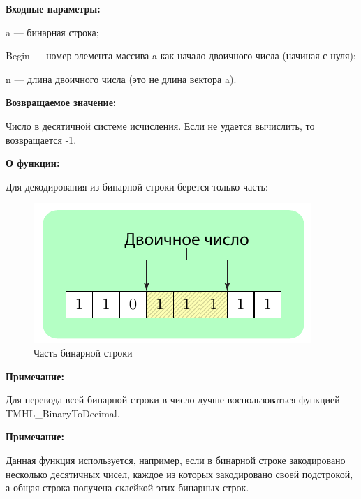\textbf{Входные параметры:}
 
 a --- бинарная строка;
 
 Begin --- номер элемента массива a как начало двоичного числа (начиная с нуля);
 
 n --- длина двоичного числа (это не длина вектора a).
 
\textbf{Возвращаемое значение:}

 Число в десятичной системе исчисления. Если не удается вычислить, то возвращается -1.
 
\textbf{О функции:}

 Для декодирования из бинарной строки берется только часть:
 
 \begin{figure} [h]
  \center
  \includegraphics [scale=1] {TMHL_BinaryToDecimalFromPart_Sheme}
  \caption{Часть бинарной строки} 
  \label{img:TMHL_BinaryToDecimalFromPart_Sheme}  
\end{figure}
 
 \textbf{Примечание:}
 
 Для перевода всей бинарной строки в число лучше воспользоваться функцией TMHL\_BinaryToDecimal.

\textbf{Примечание:}

 Данная функция используется, например, если в бинарной строке закодировано несколько десятичных чисел, каждое из которых закодировано своей подстрокой, а общая строка получена склейкой этих бинарных строк.